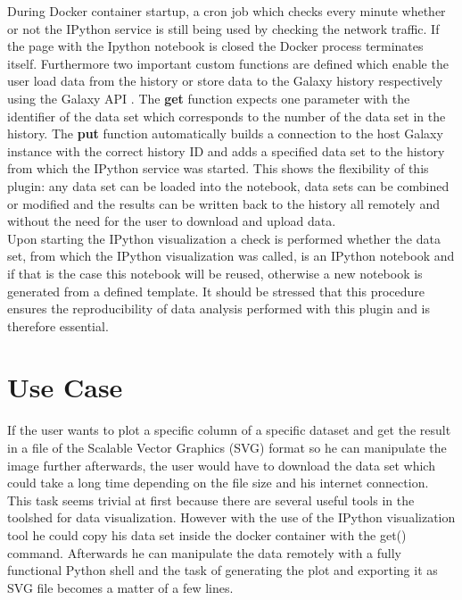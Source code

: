 \documentclass{bioinfo}
\begin{document}
\begin{methods}
During Docker container startup, a cron job which checks every minute whether or not the IPython service is still being used by checking the network traffic. If the page with the Ipython notebook is closed the Docker process terminates itself. Furthermore two important custom functions are defined which enable the user load data from the history or store data to the Galaxy history respectively using the Galaxy API \citep{Sloggett2013}. The \textbf{get} function expects one parameter with the identifier of the data set which corresponds to the number of the data set in the history. The \textbf{put} function automatically builds a connection to the host Galaxy instance with the correct history ID and adds a specified data set to the history from which the IPython service was started. This shows the flexibility of this plugin: any data set can be loaded into the notebook, data sets can be combined or modified and the results can be written back to the history all remotely and without the need for the user to download and upload data. \\
Upon starting the IPython visualization a check is performed whether the data set, from which the IPython visualization was called, is an IPython notebook and if that is the case this notebook will be reused, otherwise a new notebook is generated from a defined template. It should be stressed that this procedure ensures the reproducibility of data analysis performed with this plugin and is therefore essential. 


\section{Use Case}

If the user wants to plot a specific column of a specific dataset and get the result in a file of the Scalable Vector Graphics (SVG) format so he can manipulate the image further afterwards, the user would have to download the data set which could take a long time depending on the file size and his internet connection. This task seems trivial at first because there are several useful tools in the toolshed for data visualization. However with the use of the IPython visualization tool he could copy his data set inside the docker container with the get() command. Afterwards he can manipulate the data remotely with a fully functional Python shell and the task of generating the plot and exporting it as SVG file becomes a matter of a few lines. 


\end{methods}
\end{document}
